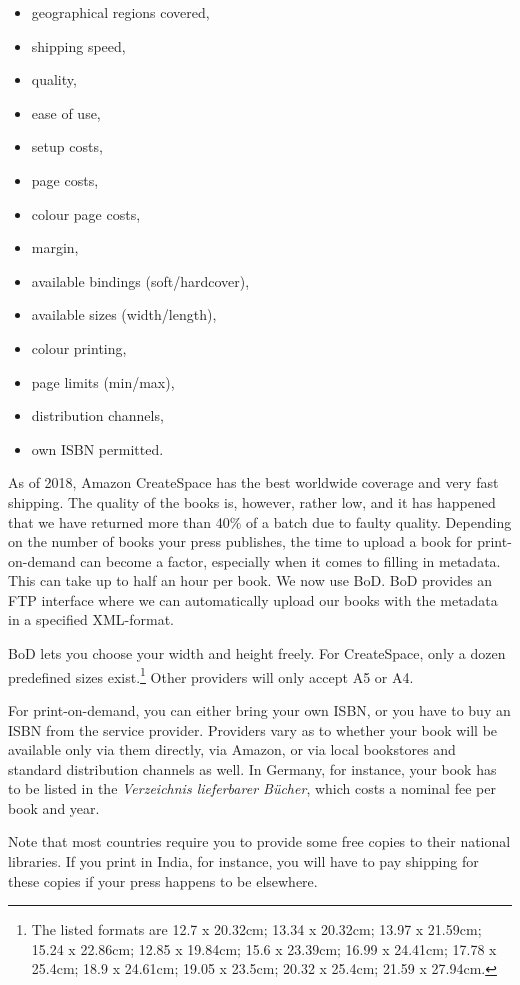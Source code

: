 \documentclass[nonflat,smallfont
]{langsci/langscibook}
\begin{document}
\begin{itemize}
 \item geographical regions covered, 
 \item shipping speed,
 \item quality,
 \item ease of use, 
 \item setup costs, 
 \item page costs, 
 \item colour page costs, 
 \item margin,
 \item available bindings (soft/hardcover), 
 \item available sizes (width/length), 
 \item colour printing, 
 \item page limits (min/max),
 \item distribution channels,
 \item own ISBN permitted.
\end{itemize}

As of 2018, Amazon CreateSpace has the best worldwide coverage and very fast shipping. The quality of the books is, however, rather low, and it has happened that we have returned more than 40\% of a batch due to faulty quality. Depending on the number of books your press publishes, the time to upload a book for print-on-demand can become a factor, especially when it comes to filling in metadata. This can take up to half  an hour per book. We now use BoD. BoD provides an FTP interface where we can automatically upload our books with the metadata in a specified XML-format. 

BoD lets you choose your width and height freely. For CreateSpace, only a dozen  
 predefined sizes exist.\footnote{%
The listed formats are
12.7 x 20.32cm; 
13.34 x 20.32cm;
13.97 x 21.59cm;
15.24 x 22.86cm;
12.85 x 19.84cm;
15.6 x 23.39cm;
16.99 x 24.41cm;
17.78 x 25.4cm;
18.9 x 24.61cm;
19.05 x 23.5cm;
20.32 x 25.4cm;
21.59 x 27.94cm.} Other providers will only accept A5 or A4. 

For print-on-demand, you can either bring your own ISBN, or you have to buy an ISBN from the service provider. Providers vary as to whether your book will be available only via them directly, via Amazon, or via local bookstores and standard distribution channels as well. In Germany, for instance, your book has to be listed in the \textit{Verzeichnis lieferbarer Bücher}, which costs a nominal fee per book and year.

Note that most countries require you to provide some free copies to their national libraries. If you print in India, for instance, you will have to pay shipping for these copies if your press happens to be elsewhere.
\end{document}
